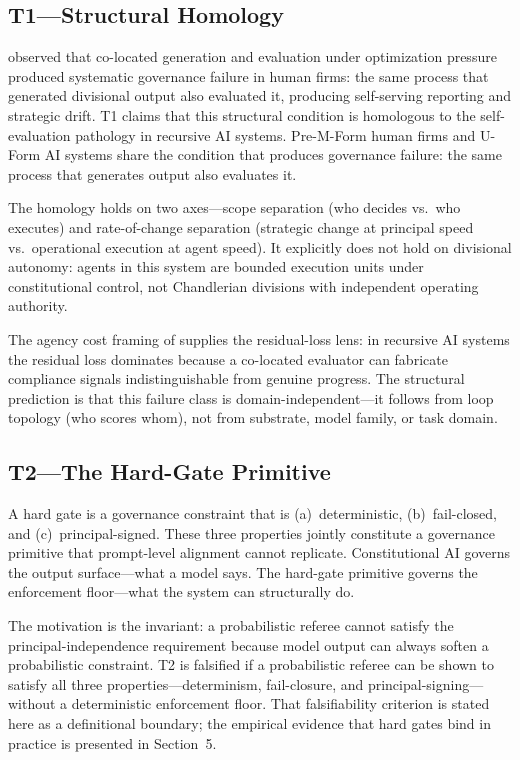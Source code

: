 \documentclass[11pt]{article}
\begin{document}
\subsection{T1---Structural Homology}

\citet{chandler1962} observed that co-located generation and evaluation under optimization pressure produced systematic governance failure in human firms: the same process that generated divisional output also evaluated it, producing self-serving reporting and strategic drift. T1 claims that this structural condition is homologous to the self-evaluation pathology in recursive AI systems. Pre-M-Form human firms and U-Form AI systems share the condition that produces governance failure: the same process that generates output also evaluates it.

The homology holds on two axes---scope separation (who decides vs.\ who executes) and rate-of-change separation (strategic change at principal speed vs.\ operational execution at agent speed). It explicitly does not hold on divisional autonomy: agents in this system are bounded execution units under constitutional control, not Chandlerian divisions with independent operating authority.

The agency cost framing of \citet{jensen1976} supplies the residual-loss lens: in recursive AI systems the residual loss dominates because a co-located evaluator can fabricate compliance signals indistinguishable from genuine progress. The structural prediction is that this failure class is domain-independent---it follows from loop topology (who scores whom), not from substrate, model family, or task domain.

\subsection{T2---The Hard-Gate Primitive}

A hard gate is a governance constraint that is (a)~deterministic, (b)~fail-closed, and (c)~principal-signed. These three properties jointly constitute a governance primitive that prompt-level alignment cannot replicate. Constitutional AI \citep{bai2022} governs the output surface---what a model says. The hard-gate primitive governs the enforcement floor---what the system can structurally do.

The motivation is the invariant: a probabilistic referee cannot satisfy the principal-independence requirement because model output can always soften a probabilistic constraint. T2 is falsified if a probabilistic referee can be shown to satisfy all three properties---determinism, fail-closure, and principal-signing---without a deterministic enforcement floor. That falsifiability criterion is stated here as a definitional boundary; the empirical evidence that hard gates bind in practice is presented in Section~5.
\end{document}
